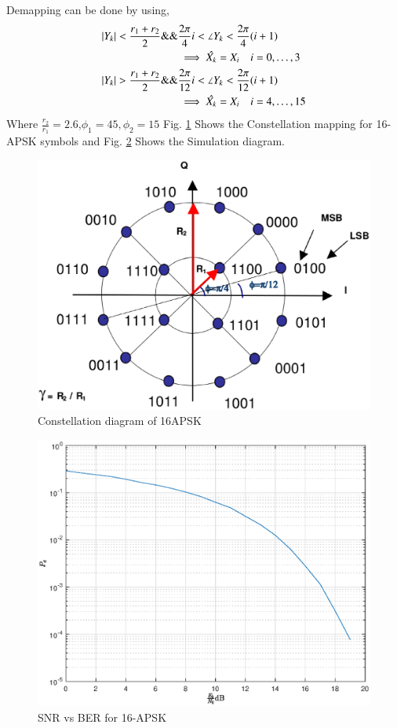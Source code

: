 \documentclass[journal,12pt,twocolumn]{IEEEtran}
\begin{document}
Demapping can be done by using,
\begin{align}
\left\vert Y_k\right\vert<\frac{r_1+r_2}{2} \&\& & \frac{2\pi }{4}i < \angle{Y_k} < \frac{2\pi }{4}(i+1)\\
& \implies \hat{X_k}=X_i \quad i=0,\dots,3\\
\left\vert Y_k\right\vert>\frac{r_1+r_2}{2} \&\& & \frac{2\pi }{12}i < \angle{Y_k} < \frac{2\pi }{12}(i+1)\\
& \implies \hat{X_k}=X_i \quad i=4,\dots,15
\end{align}
Where $\frac{r_2}{r_1}=2.6$,$\phi_1=45,\phi_2=15$
Fig. \ref{fig:16apsk} Shows the Constellation mapping for 16-APSK symbols and  Fig. \ref{fig:16apsk1} Shows the Simulation diagram.
%
\begin{figure}[!ht]
\begin{center}
\includegraphics[width=\columnwidth]{./figs/16apsk}
\end{center}
\caption{Constellation diagram of 16APSK}
\label{fig:16apsk}
\end{figure}
%
\begin{figure}[!ht]
\begin{center}
\includegraphics[width=\columnwidth]{./figs/apsk16}
\end{center}
\caption{SNR vs BER for 16-APSK}
\label{fig:16apsk1}
\end{figure}
%
\end{document}
